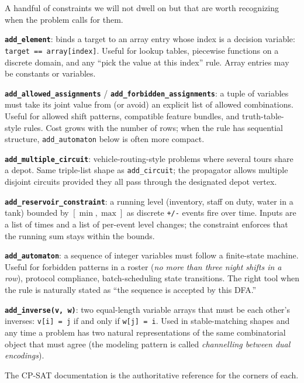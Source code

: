 A handful of constraints we will not dwell on but that are worth
recognizing when the problem calls for them.

\textbf{\lstinline!add_element!}: binds a target to an
array entry whose index is a decision variable:
\lstinline!target == array[index]!. Useful for lookup
tables, piecewise functions on a discrete domain, and any ``pick the
value at this index'' rule. Array entries may be constants or variables.

\textbf{\lstinline!add_allowed_assignments!} /
\textbf{\lstinline!add_forbidden_assignments!}: a
tuple of variables must take its joint value from (or avoid) an explicit
list of allowed combinations. Useful for allowed shift patterns,
compatible feature bundles, and truth-table-style rules. Cost grows with
the number of rows; when the rule has sequential structure,
\lstinline!add_automaton! below is often more compact.

\textbf{\lstinline!add_multiple_circuit!}:
vehicle-routing-style problems where several tours share a depot. Same
triple-list shape as \lstinline!add_circuit!; the
propagator allows multiple disjoint circuits provided they all pass
through the designated depot vertex.

\textbf{\lstinline!add_reservoir_constraint!}: a
running level (inventory, staff on duty, water in a tank) bounded by
\([\min, \max]\) as discrete \lstinline!+/-! events fire
over time. Inputs are a list of times and a list of per-event level
changes; the constraint enforces that the running sum stays within the
bounds.

\textbf{\lstinline!add_automaton!}: a sequence of
integer variables must follow a finite-state machine. Useful for
forbidden patterns in a roster (\emph{no more than three night shifts in
a row}), protocol compliance, batch-scheduling state transitions. The
right tool when the rule is naturally stated as ``the sequence is
accepted by this DFA.''

\textbf{\lstinline!add_inverse(v, w)!}: two
equal-length variable arrays that must be each other's inverses:
\lstinline!v[i] = j! if and only if
\lstinline!w[j] = i!. Used in stable-matching shapes and
any time a problem has two natural representations of the same
combinatorial object that must agree (the modeling pattern is called
\emph{channelling between dual encodings}).

The CP-SAT documentation is the authoritative reference for the corners
of each.
